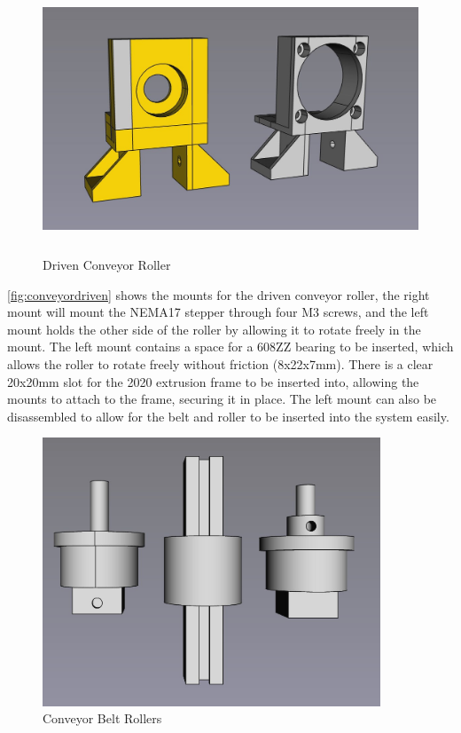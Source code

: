 \begin{figure}[H]
    \begin{minipage}[h]{0.95\textwidth}
        \centering
        \includegraphics[height=8cm]{imgs/freecad/conveyor_driven.jpg}
        \caption{Driven Conveyor Roller}
        \label{fig:conveyordriven}
    \end{minipage}
\end{figure}

\autoref{fig:conveyordriven} shows the mounts for the driven conveyor roller, the right mount will mount the NEMA17 stepper through four M3 screws, and the left mount holds the other side of the roller by allowing it to rotate freely in the mount. The left mount contains a space for a 608ZZ bearing to be inserted, which allows the roller to rotate freely without friction (8x22x7mm). There is a clear 20x20mm slot for the 2020 extrusion frame to be inserted into, allowing the mounts to attach to the frame, securing it in place. The left mount can also be disassembled to allow for the belt and roller to  be inserted into the system easily.

\begin{figure}[H]
    \begin{minipage}[h]{0.95\textwidth}
        \centering
        \includegraphics[height=8cm]{imgs/freecad/rollers.jpg}
        \caption{Conveyor Belt Rollers}
        \label{fig:conveyorrollers}
    \end{minipage}
\end{figure}

